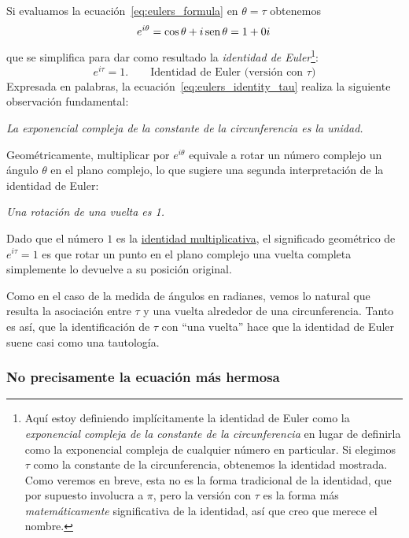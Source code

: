 Si evaluamos la ecuación~\eqref{eq:eulers_formula} en $\theta = \tau$ obtenemos 
\begin{equation}
\label{eq:eulers_identity_tau_0i}
  e^{i\theta} = \cos\theta + i\,\mbox{sen}\,\theta = 1 + 0i\,
\end{equation}
que se simplifica para dar como resultado la \emph{identidad de Euler}\footnote{Aquí estoy definiendo implícitamente la identidad de Euler como la \emph{exponencial compleja de la constante de la circunferencia} en lugar de definirla como la exponencial compleja de cualquier número en particular. Si elegimos  $\tau$ como la constante de la circunferencia, obtenemos la identidad mostrada. Como veremos en breve, esta no es la forma tradicional de la identidad, que por supuesto involucra a $\pi$, pero la versión con  $\tau$ es la forma más  \emph{matemáticamente} significativa de la identidad, así que creo que merece el nombre.}:
\begin{equation}
\label{eq:eulers_identity_tau}
e^{i\tau} = 1. \qquad\mbox{Identidad de Euler (versión con $\tau$)}
\end{equation}
Expresada en palabras, la ecuación~\eqref{eq:eulers_identity_tau} realiza la siguiente observación fundamental:

\begin{center}
\emph{La exponencial compleja de la constante de la circunferencia es la unidad.} 
\end{center}

Geométricamente, multiplicar por $e^{i\theta}$ equivale a rotar un número complejo un ángulo $\theta$ en el plano complejo, lo que sugiere una segunda interpretación de la identidad de Euler:

\begin{center}
\emph{Una rotación de una vuelta es 1.}
\end{center}


\noindent Dado que el número $1$ es la \href{https://es.wikipedia.org/wiki/Elemento_neutro}{identidad multiplicativa}, el significado geométrico de $e^{i\tau} = 1$ es que rotar un punto en el plano complejo una vuelta completa simplemente lo devuelve a su posición original.

Como en el caso de la medida de ángulos en radianes, vemos lo natural que resulta la asociación entre $\tau$ y una vuelta alrededor de una circunferencia. Tanto es así, que la identificación de $\tau$ con ``una vuelta'' hace que la identidad de Euler suene casi como una tautología.


    \subsubsection{No precisamente la ecuación más hermosa} %
    \label{sec:not_the_most_beautiful_equation}

